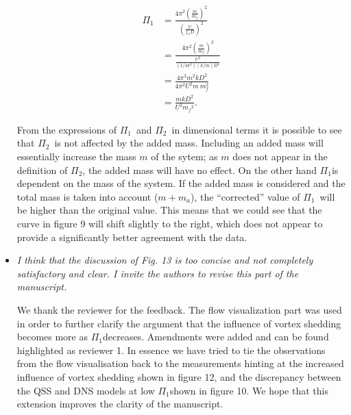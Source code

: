 \documentclass[]{article}
\newcommand{\massstiff}{\ensuremath{\Pi_1}}
\newcommand{\massdamp}{\ensuremath{\Pi_2}}
\begin{document}
\begin{itemize}
\begin{align*}
	 \massstiff &= \frac{4 {\pi}^2 {\left(\frac{m}{m_f}\right)}^2}{{\left(\frac{U}{{f_n} D}\right)}^2} \\
	 & = \frac{4 {\pi}^2 {\left(\frac{m}{m_f}\right)}^2}{{\frac{U^2}{{(1/4{\pi}^2)(k/m)} D^2}}} \\
     & = \frac{4{\pi}^2 m^2 k D^2}{4 {\pi}^2 U^2 m \ m _f^2} \\
     & = \frac{m k D^2}{U^2 {m_f}^2} .
\end{align*}

From the expressions of \massstiff \ and \massdamp \ in dimensional terms it is possible to see that \massdamp \ is not affected by the added mass. Including an added mass will essentially increase the mass $m$ of the sytem; as $m$ does not appear in the definition of \massdamp, the added mass will have no effect. On the other hand \massstiff is dependent on the mass of the system. If the added mass is considered and the total mass is taken into account ($m+m_a$), the ``corrected'' value of \massstiff\ will be higher than the original value. This means that we could see that the curve in figure 9 will shift slightly to the right, which does not appear to provide a significantly better agreement with the data. 
 
\item \emph{ I think that the discussion of Fig. 13 is too concise and not completely satisfactory and clear. I invite the authors to revise this part of the manuscript.}

We thank the reviewer for the feedback. The flow visualization part was used in order to further clarify the argument that the influence of vortex shedding becomes more as \massstiff decreases. Amendments were added and can be found highlighted as reviewer 1. In essence we have tried to tie the observations from the flow visualisation back to the measurements hinting at the increased influence of vortex shedding shown in figure 12, and the discrepancy between the QSS and DNS models at low \massstiff shown in figure 10. We hope that this extension improves the clarity of the manuscript.

\end{itemize}
\end{document}

